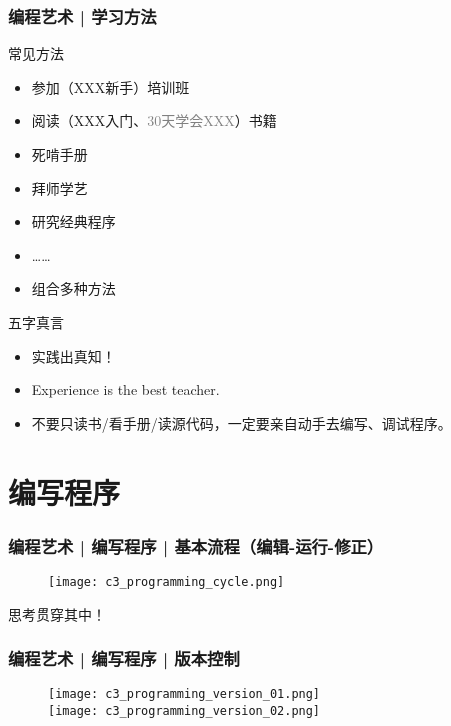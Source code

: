 \begin{frame}
  \frametitle{编程艺术 | 学习方法}
  \begin{block}{常见方法}
    \begin{itemize}
      \item 参加（XXX新手）培训班
      \item 阅读（XXX入门、\textcolor{gray}{30天学会XXX}）书籍
      \item 死啃手册
      \item 拜师学艺
      \item 研究经典程序
      \item ……
      \item 组合多种方法
    \end{itemize}
  \end{block}
  \pause
  \begin{block}{\alert{五字真言}}
    \begin{itemize}
      \item 实践出真知！
      \item Experience is the best teacher.
      \item 不要只读书/看手册/读源代码，一定要亲自动手去编写、调试程序。
    \end{itemize}
  \end{block}
\end{frame}

\section{编写程序}
\begin{frame}
  \frametitle{编程艺术 | 编写程序 | \alert{基本流程（编辑-运行-修正）}}
  \begin{figure}
    \centering
    \texttt{[image: c3\_programming\_cycle.png]}
  \end{figure}
  \pause
  \begin{center}
    \alert{思考}贯穿其中！
  \end{center}
\end{frame}

\begin{frame}
  \frametitle{编程艺术 | 编写程序 | 版本控制}
  \begin{figure}
    \centering
    \texttt{[image: c3\_programming\_version\_01.png]}\\
    \texttt{[image: c3\_programming\_version\_02.png]}\\
  \end{figure}
\end{frame}

